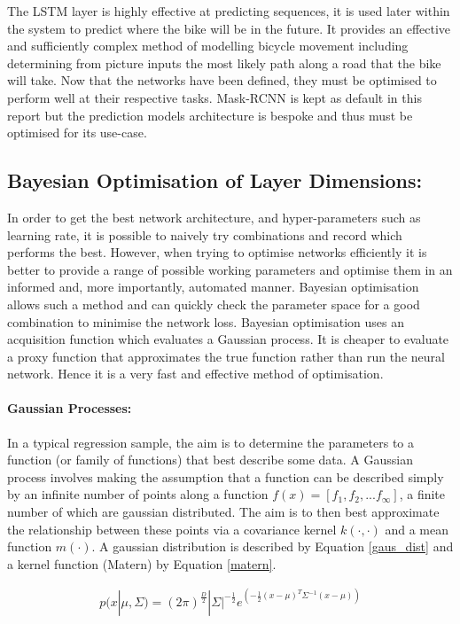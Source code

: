 \documentclass[11pt,twoside]{report}
\begin{document}
The LSTM layer is highly effective at predicting sequences, it is used later within the system to predict where the bike will be in the future. It provides an effective and sufficiently complex method of modelling bicycle movement including determining from picture inputs the most likely path along a road that the bike will take. Now that the networks have been defined, they must be optimised to perform well at their respective tasks. Mask-RCNN is kept as default in this report but the prediction models architecture is bespoke and thus must be optimised for its use-case.
 
\subsection{Bayesian Optimisation of Layer Dimensions:}
In order to get the best network architecture, and hyper-parameters such as learning rate, it is possible to naively try combinations and record which performs the best. However, when trying to optimise networks efficiently it is better to provide a range of possible working parameters and optimise them in an informed and, more importantly, automated manner. Bayesian optimisation allows such a method and can quickly check the parameter space for a good combination to minimise the network loss. Bayesian optimisation uses an acquisition function which evaluates a Gaussian process. It is cheaper to evaluate a proxy function that approximates the true function rather than run the neural network. Hence it is a very fast and effective method of optimisation.

\paragraph{Gaussian Processes:}
In a typical regression sample, the aim is to determine the parameters to a function (or family of functions) that best describe some data. A Gaussian process involves making the assumption that a function can be described simply by an infinite number of points along a function $f(x) = [f_{1},f_{2},...f_{\infty}]$, a finite number of which are gaussian distributed. The aim is to then best approximate the relationship between these points via a covariance kernel $k(\cdot,\cdot)$ and a mean function $m(\cdot)$. A gaussian distribution is described by Equation \ref{gaus_dist} and a kernel function (Matern) by Equation \ref{matern}.

\begin{equation}
\begin{aligned}
p(x|\mu,\Sigma) = (2 \pi)^{\frac{D}{2}} | \Sigma|^{- \frac{1}{2}} e^{(- \frac{1}{2}(x- \mu)^{T} \Sigma^{-1}(x- \mu))}
\end{aligned}
\label{gaus_dist}
\end{equation}
\end{document}
